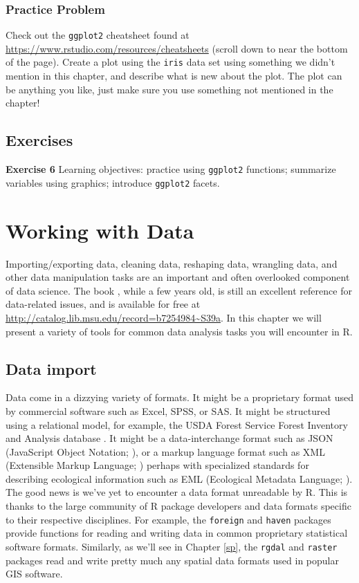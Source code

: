 \documentclass[
]{krantz}
\begin{document}
\hypertarget{ch5PP2}{%
\subsection{Practice Problem}\label{ch5PP2}}

Check out the \texttt{ggplot2} cheatsheet found at \url{https://www.rstudio.com/resources/cheatsheets} (scroll down to near the bottom of the page). Create a plot using the \texttt{iris} data set using something we didn't mention in this chapter, and describe what is new about the plot. The plot can be anything you like, just make sure you use something not mentioned in the chapter!

\hypertarget{exCh5}{%
\section{Exercises}\label{exCh5}}

\textbf{Exercise 6} Learning objectives: practice using \texttt{ggplot2} functions; summarize variables using graphics; introduce \texttt{ggplot2} facets.

\hypertarget{data2}{%
\chapter{Working with Data}\label{data2}}

Importing/exporting data, cleaning data, reshaping data, wrangling data, and other data manipulation tasks are an important and often overlooked component of data science. The book \citet{SpectorDataManipulation}, while a few years old, is still an excellent reference for data-related issues, and is available for free at \url{http://catalog.lib.msu.edu/record=b7254984~S39a}. In this chapter we will present a variety of tools for common data analysis tasks you will encounter in R.

\hypertarget{import}{%
\section{Data import}\label{import}}

Data come in a dizzying variety of formats. It might be a proprietary format used by commercial software such as Excel, SPSS, or SAS. It might be structured using a relational model, for example, the USDA Forest Service Forest Inventory and Analysis database \citep{FIADB}. It might be a data-interchange format such as JSON (JavaScript Object Notation; \citet{JSON16}), or a markup language format such as XML (Extensible Markup Language; \citet{XML2008}) perhaps with specialized standards for describing ecological information such as EML (Ecological Metadata Language; \citet{EML2019}). The good news is we've yet to encounter a data format unreadable by R. This is thanks to the large community of R package developers and data formats specific to their respective disciplines. For example, the \texttt{foreign} and \texttt{haven} packages provide functions for reading and writing data in common proprietary statistical software formats. Similarly, as we'll see in Chapter \ref{sp}, the \texttt{rgdal} and \texttt{raster} packages read and write pretty much any spatial data formats used in popular GIS software.
\end{document}
